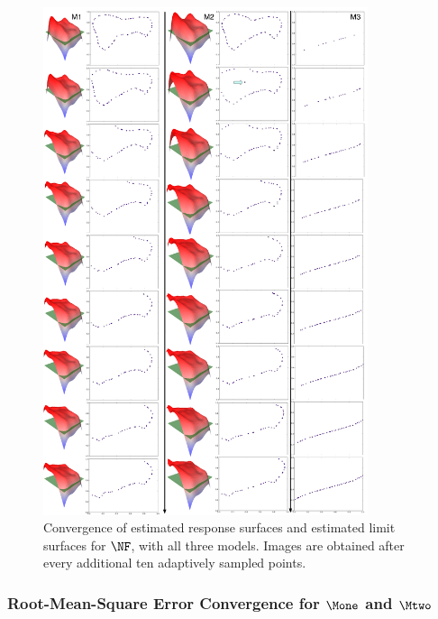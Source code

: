 \begin{figure}%
\centering
\includegraphics[width=0.85\textwidth]{figs/chap5/nuclear-F-surface-converge.pdf}
\caption{Convergence of estimated response surfaces and estimated limit surfaces for $\protect\NF$,  with all three models. Images are obtained after every additional ten adaptively sampled points.}
\label{fig:nuclear-F-surface-converge}
\end{figure}

\subsubsection{Root-Mean-Square Error Convergence for $\protect\Mone$ and $\protect\Mtwo$}


